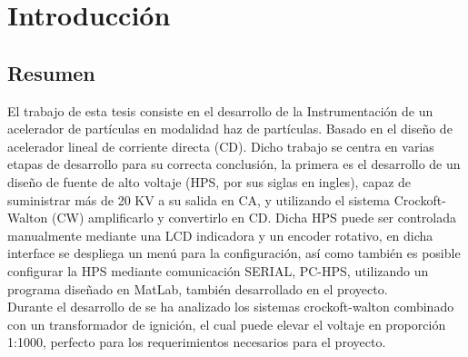 

\chapter{Introducción}


\section{Resumen} %
El trabajo de esta tesis consiste en el desarrollo de la Instrumentación de un acelerador de partículas en modalidad haz de partículas. Basado en el diseño de acelerador lineal de corriente directa (CD). Dicho trabajo se centra en varias etapas de desarrollo para su correcta conclusión, la primera es el desarrollo de un diseño de fuente de alto voltaje (HPS, por sus siglas en ingles), capaz de suministrar más de 20 KV a su salida en CA, y utilizando el sistema Crockoft-Walton (CW) amplificarlo y convertirlo en CD. Dicha HPS puede ser controlada manualmente mediante una LCD indicadora y un encoder rotativo, en dicha interface se despliega un menú para la configuración, así como también es posible configurar la HPS mediante comunicación SERIAL, PC-HPS, utilizando un programa diseñado en MatLab, también desarrollado en el proyecto. \\
Durante el desarrollo de se ha analizado los sistemas crockoft-walton combinado con un transformador de ignición, el cual puede elevar el voltaje en proporción 1:1000, perfecto para los requerimientos necesarios para el proyecto. \\

